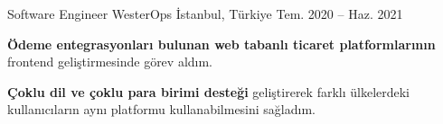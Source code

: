 \begin{cventries}
\cventry
{Software Engineer}
{WesterOps}
{İstanbul, Türkiye}
{Tem. 2020 -- Haz. 2021}
{\begin{cvitems}
\item {\textbf{Ödeme entegrasyonları bulunan web tabanlı ticaret platformlarının} frontend geliştirmesinde görev aldım.}
\item {\textbf{Çoklu dil ve çoklu para birimi desteği} geliştirerek farklı ülkelerdeki kullanıcıların aynı platformu kullanabilmesini sağladım.}
\end{cvitems}}

\end{cventries}
